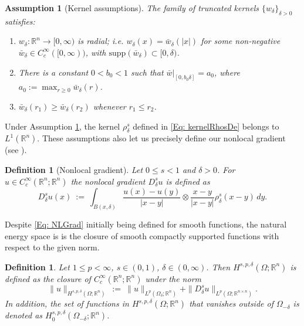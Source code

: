 \documentclass[11pt, reqno]{amsart}   	%
\theoremstyle{plain}
\numberwithin{equation}{section}
\newtheorem{assumption}[thm]{Assumption}
\newtheorem{definition}[thm]{Definition}
\def\de{\delta}
\def\Om{\Omega}
\def\R{\mathbb{R}}
\def\supp{\text{supp}}
\begin{document}
\begin{assumption}[Kernel assumptions]\label{Assump: Kernels}
		The family of truncated kernels $\{w_{\de}\}_{\de > 0}$ satisfies:
		\begin{enumerate}
			\item $w_\delta:\R^n\to[0,\infty)$ is radial; i.e. $w_\de(x)=\bar{w}_\de(|x|)$ for some non-negative $\bar{w}_\de\in C_c^\infty([0,\infty))$, with $\supp(\bar{w}_\de)\subset [0,\delta)$.
			\item There is a constant $0<b_0<1$ such that $\bar{w}|_{[0,b_0\de]}=a_0$, where $a_0 := \max_{r\ge 0}\bar{w}_\de(r)$.
			\item%
			$\bar{w}_\de (r_1) \geq \bar{w}_\de (r_2)$ whenever $r_1 \leq r_2$.	
   \end{enumerate}
	\end{assumption}
    Under Assumption \ref{Assump: Kernels}, the kernel $\rho^s_{\de}$ defined in  \eqref{Eq: kernelRhosDe} belongs to $L^1 (\R^n)$. These assumptions also let us precisely define our nonlocal gradient (see \cite[Definition 3.1]{bellido2023non}).

    	\begin{definition}[Nonlocal gradient]\label{Def: NLGrad}
		Let $0\leq s < 1$ and $\de>0$. For $u\in C^\infty_c(\R^n; \R^n)$ the nonlocal gradient $D^s_\de u$ is defined as
			\begin{equation}\label{Eq: NLGrad}
				D^s_\de u(x) \ := \ \int_{B(x,\de)} \frac{u(x)-u(y)}{|x-y|} \otimes \frac{x-y}{|x-y|}\rho^s_{\de}(x - y) \, dy.
			\end{equation}
	\end{definition}

Despite \eqref{Eq: NLGrad} initially being defined for smooth functions, the natural energy space is is the closure of smooth compactly supported functions with respect to the given norm.

	\begin{definition}\label{Def: HspdeNorm}
		Let $1 \leq p <\infty$, $s \in (0, 1)$, $\de \in (0, \infty)$. Then $H^{s,p,\de}(\Om; \R^n)$ is defined as the closure of $C^{\infty}_c(\R^n; \R^n)$ under the norm
		\begin{equation}
			\|u\|_{H^{s,p,\de}(\Om; \R^n)}\ := \ \|u\|_{L^p(\Om_{\de}; \R^n)} + \|D^s_\de u\|_{L^p(\Om; \R^{n\times n})}.
		\end{equation}
        		In addition, the set of functions in $H^{s,p,\de}(\Om; \R^n)$ that vanishes outside of  $\Om_{-\de}$ is denoted as $H^{s, p, \de}_0(\Om_{-\de}; \R^n)$. 
	\end{definition}
    
\end{document}
